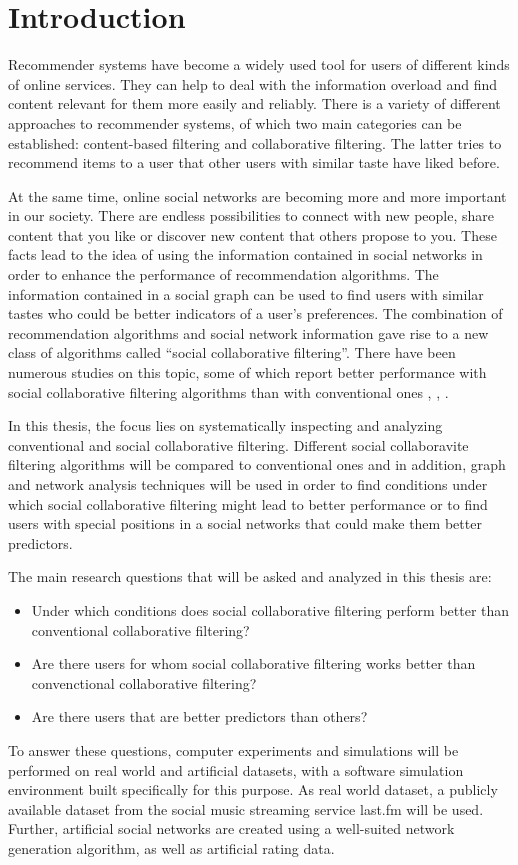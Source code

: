 \chapter{Introduction}
\label{c:introduction} Recommender systems have become a widely used tool for users of different kinds of online services. They can help to deal with the information overload and find content relevant for them more easily and reliably. There is a variety of different approaches to recommender systems, of which two main categories can be established: content-based filtering and collaborative filtering. The latter tries to recommend items to a user that other users with similar taste have liked before.

At the same time, online social networks are becoming more and more important in our society. There are endless possibilities to connect with new people, share content that you like or discover new content that others propose to you. These facts lead to the idea of using the information contained in social networks in order to enhance the performance of recommendation algorithms. The information contained in a social graph can be used to find users with similar tastes who could be better indicators of a user's preferences. The combination of recommendation algorithms and social network information gave rise to a new class of algorithms called ``social collaborative filtering''. There have been numerous studies on this topic, some of which report better performance with social collaborative filtering algorithms than with conventional ones \cite{Zheng_2008}, \cite{Konstas_2009}, \cite{Liu_2010}.

In this thesis, the focus lies on systematically inspecting and analyzing conventional and social collaborative filtering. Different social collaboravite filtering algorithms will be compared to conventional ones and in addition, graph and network analysis techniques will be used in order to find conditions under which social collaborative filtering might lead to better performance or to find users with special positions in a social networks that could make them better predictors.

The main research questions that will be asked and analyzed in this thesis are:
\begin{itemize}
\item Under which conditions does social collaborative filtering perform better than conventional collaborative filtering?
\item Are there users for whom social collaborative filtering works better than convenctional collaborative filtering?
\item Are there users that are better predictors than others?
\end{itemize}

To answer these questions, computer experiments and simulations will be performed on real world and artificial datasets, with a software simulation environment built specifically for this purpose. As real world dataset, a publicly available dataset from the social music streaming service last.fm will be used. Further, artificial social networks are created using a well-suited network generation algorithm, as well as artificial rating data.